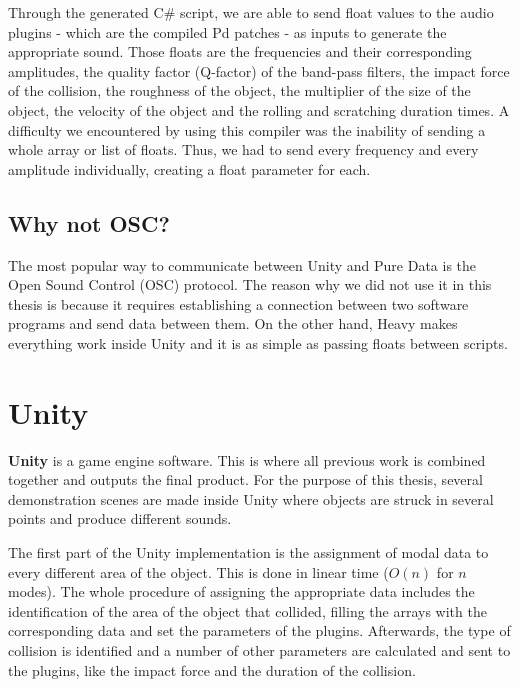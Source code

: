 Through the generated C\# script, we are able to send float values to the audio plugins - which are the compiled Pd patches - as inputs to generate the appropriate sound. Those floats are the frequencies and their corresponding amplitudes, the quality factor (Q-factor) of the band-pass filters, the impact force of the collision, the roughness of the object, the multiplier of the size of the object, the velocity of the object and the rolling and scratching duration times. A difficulty we encountered by using this compiler was the inability of sending a whole array or list of floats. Thus, we had to send every frequency and every amplitude individually, creating a float parameter for each.
 
\subsection{Why not OSC?}
The most popular way to communicate between Unity\textsuperscript{\textregistered} and Pure Data is the Open Sound Control (OSC) protocol. The reason why we did not use it in this thesis is because it requires establishing a connection between two software programs and send data between them. On the other hand, Heavy makes everything work inside Unity\textsuperscript{\textregistered} and it is as simple as passing floats between scripts. 

\section{Unity\textsuperscript{\textregistered}}
\textbf{Unity\textsuperscript{\textregistered}} is a game engine software. This is where all previous work is combined together and outputs the final product. For the purpose of this thesis, several demonstration scenes are made inside Unity\textsuperscript{\textregistered} where objects are struck in several points and produce different sounds. 

The first part of the Unity\textsuperscript{\textregistered} implementation is the assignment of modal data to every different area of the object. This is done in linear time ($O(n)$ for $n$ modes). The whole procedure of assigning the appropriate data includes the identification of the area of the object that collided, filling the arrays with the corresponding data and set the parameters of the plugins. Afterwards, the type of collision is identified and a number of other parameters are calculated and sent to the plugins, like the impact force and the duration of the collision.

